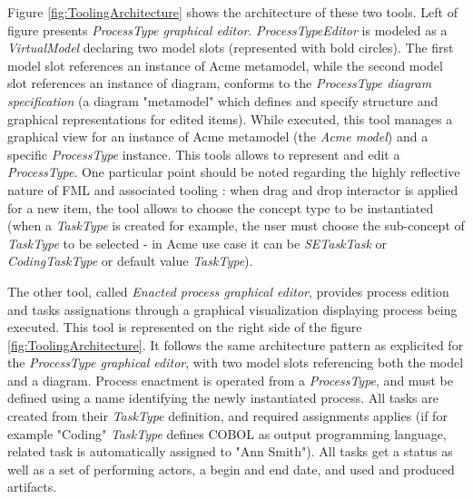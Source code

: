 Figure \ref{fig:ToolingArchitecture} shows the architecture of these two tools. Left of figure presents \textit{ProcessType graphical editor}. \textit{ProcessTypeEditor} is modeled as a \textit{VirtualModel} declaring two model slots (represented with bold circles). The first model slot references an instance of Acme metamodel, while the second model slot references an instance of diagram, conforms to the \textit{ProcessType diagram specification} (a diagram "metamodel" which defines and specify structure and graphical representations for edited items). While executed, this tool manages a graphical view for an instance of Acme metamodel (the \textit{Acme model}) and a specific \textit{ProcessType} instance. This tools allows to represent and edit a \textit{ProcessType}. One particular point should be noted regarding the highly reflective nature of FML and associated tooling : when drag and drop interactor is applied for a new item, the tool allows to choose the concept type to be instantiated (when a \textit{TaskType} is created for example, the user must choose the sub-concept of \textit{TaskType} to be selected - in Acme use case it can be \textit{SETaskTask} or \textit{CodingTaskType} or default value \textit{TaskType}). 

The other tool, called \textit{Enacted process graphical editor}, provides process edition and tasks assignations through a graphical visualization displaying process being executed. This tool is represented on the right side of the figure \ref{fig:ToolingArchitecture}. It follows the same architecture pattern as explicited for the \textit{ProcessType graphical editor}, with two model slots referencing both the model and a diagram. Process enactment is operated from a \textit{ProcessType}, and must be defined using a name identifying the newly instantiated process. All tasks are created from their \textit{TaskType} definition, and required assignments applies (if for example "Coding" \textit{TaskType} defines COBOL as output programming language, related task is automatically assigned to "Ann Smith"). All tasks get a status as well as a set of performing actors, a begin and end date, and used and produced artifacts. 




